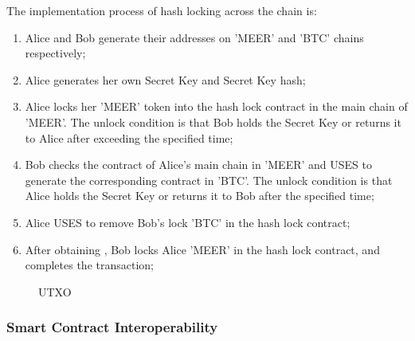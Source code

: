 \documentclass[a4paper,11pt]{article}
\begin{document}
The implementation process of hash locking across the chain is:

\begin{enumerate}
\item  Alice and Bob generate their addresses on 'MEER' and 'BTC' chains respectively;

\item Alice generates her own Secret Key and Secret Key hash;

\item Alice locks her 'MEER' token into the hash lock contract in the main chain of 'MEER'. The unlock condition is that Bob holds the Secret Key or returns it to Alice after exceeding the specified time;

\item Bob checks the contract of Alice's main chain in 'MEER' and USES to generate the corresponding contract in 'BTC'. The unlock condition is that Alice holds the Secret Key or returns it to Bob after the specified time;

\item Alice USES to remove Bob's lock 'BTC' in the hash lock contract;

\item After obtaining , Bob locks Alice 'MEER' in the hash lock contract, and completes the transaction;

\end{enumerate}

\begin{figure}[hbt]
	\centerline{%
	}
\caption{UTXO}
\end{figure}



\subsubsection{Smart Contract Interoperability}
\end{document}

